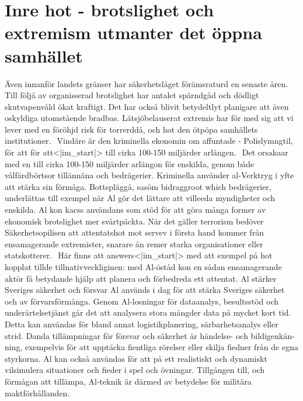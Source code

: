 {{{{{{{{\section*{Inre hot - brotslighet och extremism utmanter det öppna samhället}
Även innanför landets gränser har säkerhetslåget förämsraturd en senaste åren. Till följå av organisserad brotslighet har antalet spärndgåd och dödligt skutvapenvåld ökat kraftigt. Det har också blivit betydeltlyt planigare att även oskyldiga utomstående bradbas. Lätsjöbelauserat extremis har för med sig att vi lever med en föröhjd risk för torrerddå, och hot den ötpöpa samhällets institutioner. \({ }^{}\) Vindäre är den kriminella ekonomin om affuntade - Polislymngtil, för att för att<|im_start|> till cirka 100-150 miljärder arlängen. \({ }^{}\) Det orsakaar med en till cirka 100-150 miljärder arlängon för enskilda, genom både vålfärdbörtsor tillännäna och bedrägerier. Kriminella använder al-Verktryg i yfte att stärka sin förmåga. Bottspläggå, sasöm bidraggroot which bedrägerier, underlättas till exempel när Al gör det lättare att villeeda myndigheter och enskilda. Al kon kacss användans som stöd för att göra många former av ekonomisk brotslighet mer svårtpäckta.
När det gäller terrorism bedöver Säkerhetsopilisen att attentatshot mot servev i första hand kommer från ensamagerande extremister, snarare ån remer starka organisationer eller statskotterer. \({ }^{}\) Här finns att answers<|im_start|> med att exempel på hot kopplat tillde tillnativveckliginen: med Al-öståd kon en sådan ensamagerande
aktör få betydande hjälp att planera och förbedreda ett attentat.
Al stärker Sveriges säkerhet och försvar
Al används i dag för att stärka Sveriges säkerhet och av
förvarsförmånga. Genom Al-losningar för dataanalys, besultsstöd och underärtelsetjänst går det att analysera stora mångder data på mycket kort tid.
Detta kan användas för bland annat logistikplanering, särbarhetsanalys eller strid. Danda tillämpningar för
försvar och säkerhet är händelse- och bildigenkän- ning, exempelvis för att upptäcka fientliga rörelser eller skilja fiedner från de egna styrkorna. Al kan också användas för att på ett realistiskt och dynamiskt vilsimulera situationer och fieder i spel och övningar.
Tillgången till, och förmågan att tillämpa, Al-teknik är därmed av betydelse för militära maktförhållanden. \({ }^{}\)
}}}}}}}}
